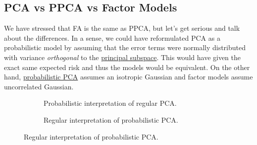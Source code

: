 \subsection{PCA vs PPCA vs Factor Models} 

  We have stressed that FA is the same as PPCA, but let's get serious and talk about the differences. In a sense, we could have reformulated PCA as a probabilistic model by assuming that the error terms were normally distributed with variance \textit{orthogonal} to the \hyperref[def:principal-subspace]{principal subspace}. This would have given the exact same expected risk and thus the models would be equivalent. On the other hand, \hyperref[def:probabilistic-pca]{probabilistic PCA} assumes an isotropic Gaussian and factor models assume uncorrelated Gaussian. 

  \begin{figure}[H]
    \centering
    \begin{subfigure}[b]{0.6\textwidth}
      \centering
      \caption{Probabilistic interpretation of regular PCA.}
    \end{subfigure}
    
    \begin{subfigure}[b]{0.6\textwidth}
      \centering
      \caption{Regular interpretation of probabilistic PCA.}
    \end{subfigure}
    

\end{figure}

